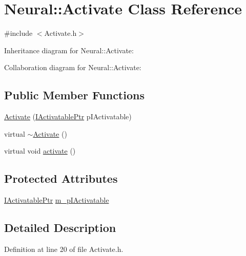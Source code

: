 \hypertarget{class_neural_1_1_activate}{
\section{Neural::Activate Class Reference}
\label{class_neural_1_1_activate}
}


{\ttfamily \#include $<$Activate.h$>$}



Inheritance diagram for Neural::Activate:


Collaboration diagram for Neural::Activate:
\subsection*{Public Member Functions}
\begin{DoxyCompactItemize}
\item 
\hyperlink{class_neural_1_1_activate_a057b63a3579b44fc33967b9ea2bfc33e}{Activate} (\hyperlink{namespace_neural_a2c97f9785f7a89940e070ce1eb702050}{IActivatablePtr} pIActivatable)
\item 
virtual \hyperlink{class_neural_1_1_activate_ae12680c3ca45469569c1ab44dc4f0394}{$\sim$Activate} ()
\item 
virtual void \hyperlink{class_neural_1_1_activate_a0715b49bd6a5d73e12069e32c63c6308}{activate} ()
\end{DoxyCompactItemize}
\subsection*{Protected Attributes}
\begin{DoxyCompactItemize}
\item 
\hyperlink{namespace_neural_a2c97f9785f7a89940e070ce1eb702050}{IActivatablePtr} \hyperlink{class_neural_1_1_activate_a9848f6b94305235b0af46088c289c9ee}{m\_\-pIActivatable}
\end{DoxyCompactItemize}


\subsection{Detailed Description}


Definition at line 20 of file Activate.h.



